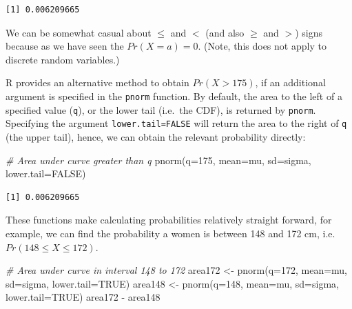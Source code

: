 \documentclass[
  oneside]{krantz}
\newenvironment{Shaded}{\begin{snugshade}}{\end{snugshade}}
\newcommand{\AttributeTok}[1]{\textcolor[rgb]{0.77,0.63,0.00}{#1}}
\newcommand{\CommentTok}[1]{\textcolor[rgb]{0.56,0.35,0.01}{\textit{#1}}}
\newcommand{\ConstantTok}[1]{\textcolor[rgb]{0.00,0.00,0.00}{#1}}
\newcommand{\DecValTok}[1]{\textcolor[rgb]{0.00,0.00,0.81}{#1}}
\newcommand{\FunctionTok}[1]{\textcolor[rgb]{0.00,0.00,0.00}{#1}}
\newcommand{\NormalTok}[1]{#1}
\newcommand{\OtherTok}[1]{\textcolor[rgb]{0.56,0.35,0.01}{#1}}
\newcommand{\SpecialCharTok}[1]{\textcolor[rgb]{0.00,0.00,0.00}{#1}}
\begin{document}
\begin{verbatim}
[1] 0.006209665
\end{verbatim}

We can be somewhat casual about \(\le\) and \(<\) (and also \(\ge\) and \(>\)) signs because as we have seen the \(Pr(X=a) = 0\). (Note, this does not apply to discrete random variables.)

R provides an alternative method to obtain \(Pr(X > 175)\), if an additional argument is specified in the \texttt{pnorm} function. By default, the area to the left of a specified value (\texttt{q}), or the lower tail (i.e.~the CDF), is returned by \texttt{pnorm}. Specifying the argument \texttt{lower.tail=FALSE} will return the area to the right of \texttt{q} (the upper tail), hence, we can obtain the relevant probability directly:

\begin{Shaded}
\begin{Highlighting}[]
\CommentTok{\# Area under curve greater than q}
\FunctionTok{pnorm}\NormalTok{(}\AttributeTok{q=}\DecValTok{175}\NormalTok{, }\AttributeTok{mean=}\NormalTok{mu, }\AttributeTok{sd=}\NormalTok{sigma, }\AttributeTok{lower.tail=}\ConstantTok{FALSE}\NormalTok{)}
\end{Highlighting}
\end{Shaded}

\begin{verbatim}
[1] 0.006209665
\end{verbatim}

These functions make calculating probabilities relatively straight forward, for example, we can find the probability a women is between 148 and 172 cm, i.e.~\(Pr(148 \le X \le 172)\).

\begin{Shaded}
\begin{Highlighting}[]
\CommentTok{\# Area under curve in interval 148 to 172}
\NormalTok{area172 }\OtherTok{\textless{}{-}} \FunctionTok{pnorm}\NormalTok{(}\AttributeTok{q=}\DecValTok{172}\NormalTok{, }\AttributeTok{mean=}\NormalTok{mu, }\AttributeTok{sd=}\NormalTok{sigma, }\AttributeTok{lower.tail=}\ConstantTok{TRUE}\NormalTok{)}
\NormalTok{area148 }\OtherTok{\textless{}{-}} \FunctionTok{pnorm}\NormalTok{(}\AttributeTok{q=}\DecValTok{148}\NormalTok{, }\AttributeTok{mean=}\NormalTok{mu, }\AttributeTok{sd=}\NormalTok{sigma, }\AttributeTok{lower.tail=}\ConstantTok{TRUE}\NormalTok{)}
\NormalTok{area172 }\SpecialCharTok{{-}}\NormalTok{ area148}
\end{Highlighting}
\end{Shaded}
\end{document}
